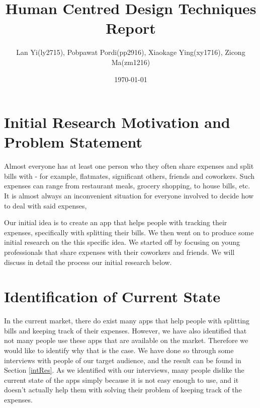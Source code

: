 \documentclass[a4wide, 10pt]{article}
\begin{document}
\title{\vspace{-8ex}Human Centred Design Techniques Report \vspace{-2ex}}

\author{Lan Yi(ly2715), Pobpawat Pordi(pp2916), Xiaokage Ying(xy1716), Zicong Ma(zm1216)}
\date{\vspace{-2ex}\today\vspace{-4ex}}         %

\maketitle            %

\section{Initial Research Motivation and Problem Statement} 
\vspace{-3ex}
Almost everyone has at least one person who they often share expenses and split bills with - for example, flatmates, significant others, friends and coworkers. Such expenses can range from restaurant meals, grocery shopping, to house bills, etc. It is almost always an inconvenient situation for everyone involved to decide how to deal with said expenses,

Our initial idea is to create an app that helps people with tracking their expenses, specifically with splitting their bills. We then went on to produce some initial research on the this specific idea. We started off by focusing on young professionals that share expenses with their coworkers and friends. We will discuss in detail the process our initial research below.
\vspace{-3ex}
\section{Identification of Current State}
\vspace{-3ex}
In the current market, there do exist many apps that help people with splitting bills and keeping track of their expenses. However, we have also identified that not many people use these apps that are available on the market. Therefore we would like to identify why that is the case. We have done so through some interviews with people of our target audience, and the result can be found in Section \ref{intRes}. As we identified with our interviews, many people dislike the current state of the apps simply because it is not easy enough to use, and it doesn't actually help them with solving their problem of keeping track of the expenses.
\vspace{-3ex}
\end{document}
